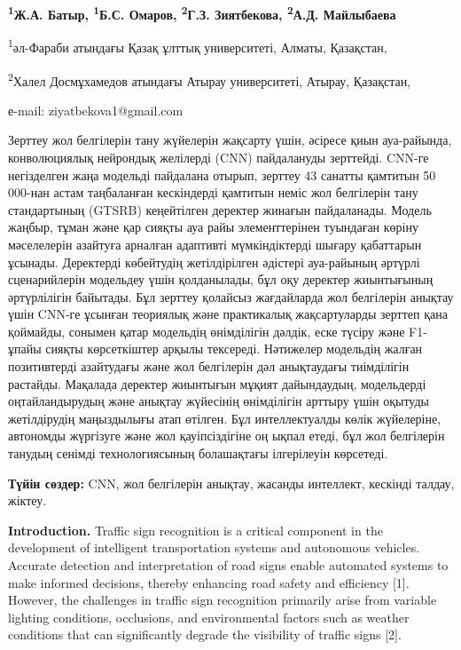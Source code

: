 \textbf{\textsuperscript{1}Ж.А. Батыр, \textsuperscript{1}Б.С. Омаров,
\textsuperscript{2}Г.З. Зиятбекова, \textsuperscript{2}А.Д. Майлыбаева}

\textsuperscript{1}әл-Фараби атындағы Қазақ ұлттық университеті, Алматы,
Қазақстан,

\textsuperscript{2}Халел Досмұхамедов атындағы Атырау университеті,
Атырау, Қазақстан,

е-mail: ziyatbekova1@gmail.com

Зерттеу жол белгілерін тану жүйелерін жақсарту үшін, әсіресе қиын
ауа-райында, конволюциялық нейрондық желілерді (CNN) пайдалануды
зерттейді. CNN-ге негізделген жаңа модельді пайдалана отырып, зерттеу 43
санатты қамтитын 50 000-нан астам таңбаланған кескіндерді қамтитын неміс
жол белгілерін тану стандартының (GTSRB) кеңейтілген деректер жинағын
пайдаланады. Модель жаңбыр, тұман және қар сияқты ауа райы
элементтерінен туындаған көріну мәселелерін азайтуға арналған адаптивті
мүмкіндіктерді шығару қабаттарын ұсынады. Деректерді көбейтудің
жетілдірілген әдістері ауа-райының әртүрлі сценарийлерін модельдеу үшін
қолданылады, бұл оқу деректер жиынтығының әртүрлілігін байытады. Бұл
зерттеу қолайсыз жағдайларда жол белгілерін анықтау үшін CNN-ге ұсынған
теориялық және практикалық жақсартуларды зерттеп қана қоймайды, сонымен
қатар модельдің өнімділігін дәлдік, еске түсіру және F1-ұпайы сияқты
көрсеткіштер арқылы тексереді. Нәтижелер модельдің жалған позитивтерді
азайтудағы және жол белгілерін дәл анықтаудағы тиімділігін растайды.
Мақалада деректер жиынтығын мұқият дайындаудың, модельдерді
оңтайландырудың және анықтау жүйесінің өнімділігін арттыру үшін оқытуды
жетілдірудің маңыздылығы атап өтілген. Бұл интеллектуалды көлік
жүйелеріне, автономды жүргізуге және жол қауіпсіздігіне оң ықпал етеді,
бұл жол белгілерін танудың сенімді технологиясының болашақтағы
ілгерілеуін көрсетеді.

\textbf{Түйін сөздер:} CNN, жол белгілерін анықтау, жасанды интеллект,
кескінді талдау, жіктеу.

\textbf{Introduction.} Traffic sign recognition is a critical component
in the development of intelligent transportation systems and autonomous
vehicles. Accurate detection and interpretation of road signs enable
automated systems to make informed decisions, thereby enhancing road
safety and efficiency {[}1{]}. However, the challenges in traffic sign
recognition primarily arise from variable lighting conditions,
occlusions, and environmental factors such as weather conditions that
can significantly degrade the visibility of traffic signs {[}2{]}.

